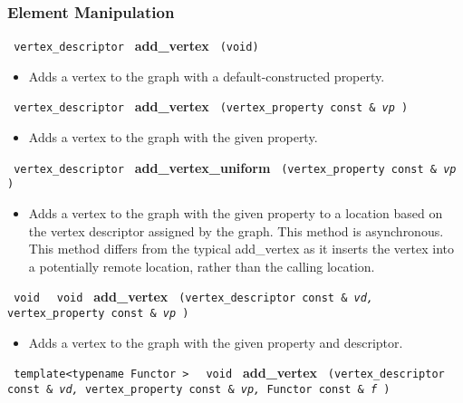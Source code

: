 \subsubsection{ Element Manipulation}

\noindent
\texttt{%
vertex\_descriptor
}
\newline
\textbf{add\_vertex}%
\texttt{%
(void)
}

\begin{itemize}
\item
Adds a vertex to the graph with a default-constructed property.
\end{itemize}

\noindent
\texttt{%
vertex\_descriptor
}
\newline
\textbf{add\_vertex}%
\texttt{%
(vertex\_property const \&
\textit{vp}%
)
}

\begin{itemize}
\item
Adds a vertex to the graph with the given property.
\end{itemize}

\noindent
\texttt{%
vertex\_descriptor
}
\newline
\textbf{add\_vertex\_uniform}%
\texttt{%
(vertex\_property const \&
\textit{vp}%
)
}

\begin{itemize}
\item
Adds a vertex to the graph with the given property to a location based on the vertex descriptor assigned by the graph. This method is asynchronous. This method differs from the typical add\_vertex as it inserts the vertex into a potentially remote location, rather than the calling location.
\end{itemize}

\noindent
\texttt{%
void
}
\texttt{%
void
}
\newline
\textbf{add\_vertex}%
\texttt{%
(vertex\_descriptor const \&
\textit{vd,}%
vertex\_property const \&
\textit{vp}%
)
}

\begin{itemize}
\item
Adds a vertex to the graph with the given property and descriptor.
\end{itemize}

\noindent
\texttt{%
template<typename Functor >
}
\texttt{%
void
}
\newline
\textbf{add\_vertex}%
\texttt{%
(vertex\_descriptor const \&
\textit{vd,}%
vertex\_property const \&
\textit{vp,}%
Functor const \&
\textit{f}%
)
}

